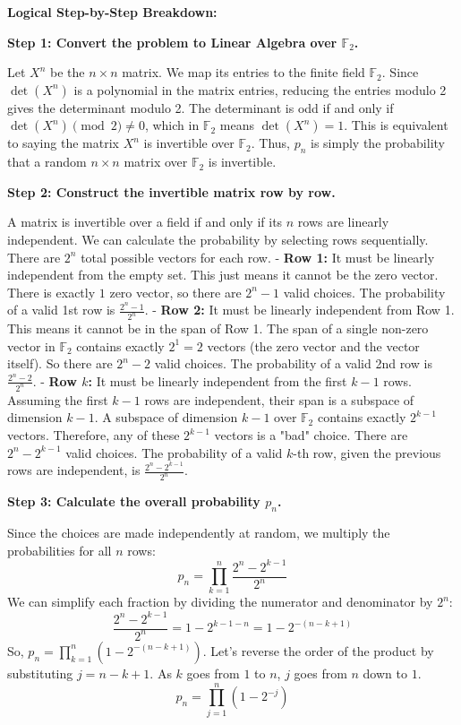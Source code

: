 \begin{solution}
\textbf{Logical Step-by-Step Breakdown:}

\textbf{Step 1: Convert the problem to Linear Algebra over $\mathbb{F}_2$.}

Let $X^n$ be the $n \times n$ matrix. We map its entries to the finite field $\mathbb{F}_2$.
Since $\det(X^n)$ is a polynomial in the matrix entries, reducing the entries modulo 2 gives the determinant modulo 2.
The determinant is odd if and only if $\det(X^n) \pmod 2 \neq 0$, which in $\mathbb{F}_2$ means $\det(X^n) = 1$.
This is equivalent to saying the matrix $X^n$ is invertible over $\mathbb{F}_2$.
Thus, $p_n$ is simply the probability that a random $n \times n$ matrix over $\mathbb{F}_2$ is invertible.

\textbf{Step 2: Construct the invertible matrix row by row.}

A matrix is invertible over a field if and only if its $n$ rows are linearly independent. We can calculate the probability by selecting rows sequentially.
There are $2^n$ total possible vectors for each row.
- \textbf{Row 1:} It must be linearly independent from the empty set. This just means it cannot be the zero vector.
There is exactly $1$ zero vector, so there are $2^n - 1$ valid choices.
The probability of a valid 1st row is $\frac{2^n - 1}{2^n}$.
- \textbf{Row 2:} It must be linearly independent from Row 1. This means it cannot be in the span of Row 1.
The span of a single non-zero vector in $\mathbb{F}_2$ contains exactly $2^1 = 2$ vectors (the zero vector and the vector itself).
So there are $2^n - 2$ valid choices.
The probability of a valid 2nd row is $\frac{2^n - 2}{2^n}$.
- \textbf{Row $k$:} It must be linearly independent from the first $k-1$ rows. Assuming the first $k-1$ rows are independent, their span is a subspace of dimension $k-1$.
A subspace of dimension $k-1$ over $\mathbb{F}_2$ contains exactly $2^{k-1}$ vectors.
Therefore, any of these $2^{k-1}$ vectors is a "bad" choice. There are $2^n - 2^{k-1}$ valid choices.
The probability of a valid $k$-th row, given the previous rows are independent, is $\frac{2^n - 2^{k-1}}{2^n}$.

\textbf{Step 3: Calculate the overall probability $p_n$.}

Since the choices are made independently at random, we multiply the probabilities for all $n$ rows:
\[ p_n = \prod_{k=1}^n \frac{2^n - 2^{k-1}}{2^n} \]
We can simplify each fraction by dividing the numerator and denominator by $2^n$:
\[ \frac{2^n - 2^{k-1}}{2^n} = 1 - 2^{k-1-n} = 1 - 2^{-(n-k+1)} \]
So, $p_n = \prod_{k=1}^n (1 - 2^{-(n-k+1)})$.
Let's reverse the order of the product by substituting $j = n - k + 1$. As $k$ goes from $1$ to $n$, $j$ goes from $n$ down to $1$.
\[ p_n = \prod_{j=1}^n (1 - 2^{-j}) \]


\end{solution}
